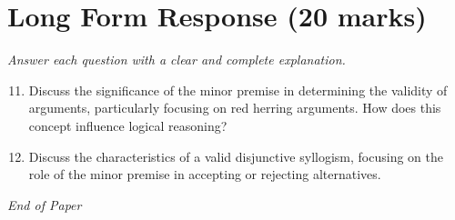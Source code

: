 \documentclass[12pt]{article}
\begin{document}
\section*{Long Form Response (20 marks)}
\textit{Answer each question with a clear and complete explanation.}
\begin{enumerate}[label=\arabic*.]
\setcounter{enumi}{10}
\item Discuss the significance of the minor premise in determining the validity of arguments, particularly focusing on red herring arguments. How does this concept influence logical reasoning?
\item Discuss the characteristics of a valid disjunctive syllogism, focusing on the role of the minor premise in accepting or rejecting alternatives.
\end{enumerate}

\vfill
\noindent\textit{End of Paper}
\end{document}
